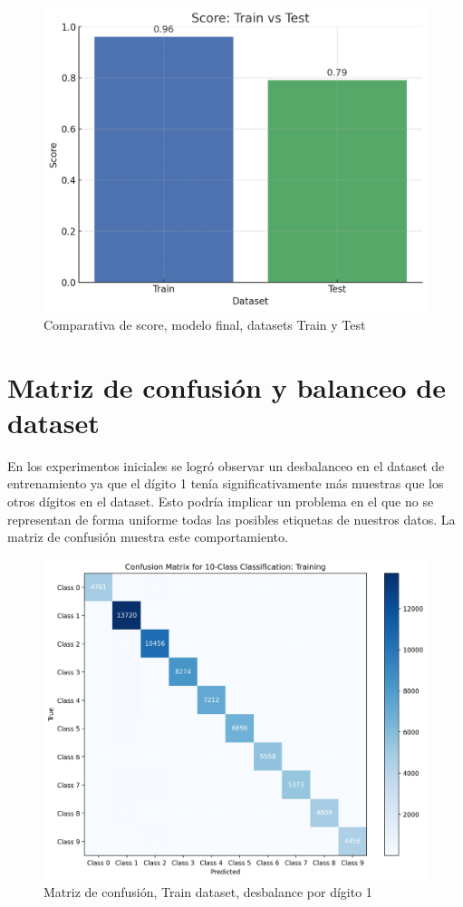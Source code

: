 \documentclass[journal]{IEEEtran}
\begin{document}
\begin{figure}[H]
        \centering
        \includegraphics[width=0.9\linewidth]{figures/train_vs_test_final.png}
        \caption{Comparativa de score, modelo final, datasets Train y Test}
        \label{fig:score_train_vs_test}
\end{figure}

\section{Matriz de confusión y balanceo de dataset}
En los experimentos iniciales se logró observar un desbalanceo en el dataset de entrenamiento ya que el dígito 1 tenía significativamente más muestras que los otros dígitos en el dataset. Esto podría implicar un problema en el que no se representan de forma uniforme todas las posibles etiquetas de nuestros datos. La matriz de confusión muestra este comportamiento.

\begin{figure}[H]
        \centering
        \includegraphics[width=\linewidth]{figures/confusion_matrix_Training_preSMOTE.png}
        \caption{Matriz de confusión, Train dataset, desbalance por dígito 1}
        \label{fig:confusion_matrix_pre_smote}
\end{figure}
\end{document}
